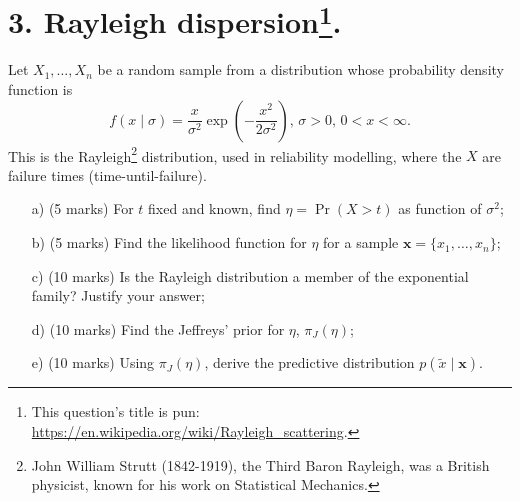 \documentclass[a4paper,10pt, notitlepage]{report}
\newcommand{\pr}{\operatorname{Pr}} %
\begin{document}


\section*{3. Rayleigh dispersion\footnote{This question's title is pun: \url{https://en.wikipedia.org/wiki/Rayleigh_scattering}.}.}

Let $X_1, \ldots, X_n$ be a random sample from a distribution whose probability density function is
\begin{equation*}
 f(x \mid \sigma) = \frac{x}{\sigma^2} \exp\left(-\frac{x^2}{2\sigma^2}\right),\, \sigma>0,\, 0 < x < \infty.
\end{equation*}
This is the Rayleigh\footnote{John William Strutt (1842-1919), the Third Baron Rayleigh, was a British physicist, known for his work on Statistical Mechanics.} distribution, used in reliability modelling, where the $X$ are failure times (time-until-failure).
\begin{itemize}
 \item[a)] (5 marks) For $t$ fixed and known, find $\eta = \pr(X > t)$ as function of $\sigma^2$;
 
 
 
 \item[b)] (5 marks) Find the likelihood function for $\eta$ for a sample $\boldsymbol{x} = \{x_1, \ldots, x_n\}$;
 
 

 \item[c)] (10 marks) Is the Rayleigh distribution a member of the exponential family? Justify your answer;
 
 

 \item[d)] (10 marks) Find the Jeffreys' prior for $\eta$, $\pi_J(\eta)$;
 
 

 \item[e)] (10 marks) Using $\pi_J(\eta)$, derive the predictive distribution $p(\tilde{x} \mid \boldsymbol{x})$.
 
 
 
\end{itemize}



\end{document}
